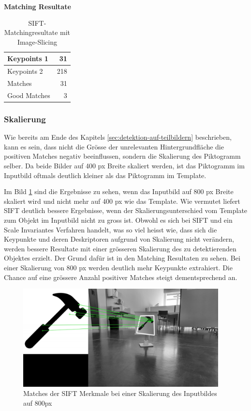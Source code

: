 \textbf{Matching Resultate}
\begin{center}
\begin{table}[H]
\begin{tabular}{|l|r|}
\hline
Keypoints 1 & 31 \\
\hline
Keypoints 2 & 218 \\
\hline
Matches & 31 \\
\hline
Good Matches & 3 \\
\hline
\end{tabular}
\caption[SIFT-Matchingresultate mit Image-Slicing]{SIFT-Matchingresultate mit Image-Slicing}
\label{tab:sift-matchingresultate-image-slicing}
\end{table}
\end{center}

\subsubsection{Skalierung}
Wie bereits am Ende des Kapitels \ref{sec:detektion-auf-teilbildern} beschrieben, kann es sein, dass nicht die Grösse der unrelevanten Hintergrundfläche die positiven Matches negativ beeinflussen, sondern die Skalierung des Piktogramm selber. Da beide Bilder auf 400 px Breite skaliert werden, ist das Piktogramm im Inputbild oftmals deutlich kleiner als das Piktogramm im Template. 

Im Bild \ref{fig:sift-matches-800} sind die Ergebnisse zu sehen, wenn das Inputbild auf 800 px Breite skaliert wird und nicht mehr auf 400 px wie das Template. Wie vermutet liefert SIFT deutlich bessere Ergebnisse, wenn der Skalierungsunterschied vom Template zum Objekt im Inputbild nicht zu gross ist. Obwohl es sich bei SIFT und ein Scale Invariantes Verfahren handelt, was so viel heisst wie, dass sich die Keypunkte und deren Deskriptoren aufgrund von Skalierung nicht verändern, werden bessere Resultate mit einer grösseren Skalierung des zu detektierenden Objektes erzielt. Der Grund dafür ist in den Matching Resultaten zu sehen. Bei einer Skalierung von 800 px werden deutlich mehr Keypunkte extrahiert. Die Chance auf eine grössere Anzahl positiver Matches steigt dementsprechend an.

\begin{figure}[H]
  \includegraphics[width=0.95\textwidth]{img/piktogrammerkennung/sift_matches_800.jpg}
  \centering
  \caption{Matches der SIFT Merkmale bei einer Skalierung des Inputbildes auf 800px}
  \label{fig:sift-matches-800}
\end{figure}


